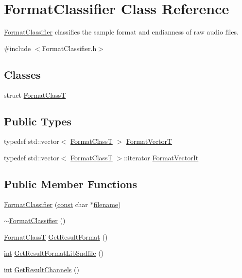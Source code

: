 \hypertarget{class_format_classifier}{}\section{Format\+Classifier Class Reference}
\label{class_format_classifier}


\hyperlink{class_format_classifier}{Format\+Classifier} classifies the sample format and endianness of raw audio files.  




{\ttfamily \#include $<$Format\+Classifier.\+h$>$}

\subsection*{Classes}
\begin{DoxyCompactItemize}
\item 
struct \hyperlink{struct_format_classifier_1_1_format_class_t}{Format\+ClassT}
\end{DoxyCompactItemize}
\subsection*{Public Types}
\begin{DoxyCompactItemize}
\item 
typedef std\+::vector$<$ \hyperlink{struct_format_classifier_1_1_format_class_t}{Format\+ClassT} $>$ \hyperlink{class_format_classifier_ab1d40cc2906c7467afd2dbe19c1a32cd}{Format\+VectorT}
\item 
typedef std\+::vector$<$ \hyperlink{struct_format_classifier_1_1_format_class_t}{Format\+ClassT} $>$\+::iterator \hyperlink{class_format_classifier_a0f41cb1c1399ffa2a8cccf466869228a}{Format\+Vector\+It}
\end{DoxyCompactItemize}
\subsection*{Public Member Functions}
\begin{DoxyCompactItemize}
\item 
\hyperlink{class_format_classifier_abec9c72f9f910f16217e45f516622347}{Format\+Classifier} (\hyperlink{getopt1_8c_a2c212835823e3c54a8ab6d95c652660e}{const} char $\ast$\hyperlink{test__portburn_8cpp_a7efa5e9c7494c7d4586359300221aa5d}{filename})
\item 
\hyperlink{class_format_classifier_a018032593215703f29768eea62d3543e}{$\sim$\+Format\+Classifier} ()
\item 
\hyperlink{struct_format_classifier_1_1_format_class_t}{Format\+ClassT} \hyperlink{class_format_classifier_a5c3da894724672438a593b3ce0787f90}{Get\+Result\+Format} ()
\item 
\hyperlink{xmltok_8h_a5a0d4a5641ce434f1d23533f2b2e6653}{int} \hyperlink{class_format_classifier_ad8cb470d13404150beded475d72b0f46}{Get\+Result\+Format\+Lib\+Sndfile} ()
\item 
\hyperlink{xmltok_8h_a5a0d4a5641ce434f1d23533f2b2e6653}{int} \hyperlink{class_format_classifier_a25e306cddc659911810dce14ba4e8817}{Get\+Result\+Channels} ()
\end{DoxyCompactItemize}


